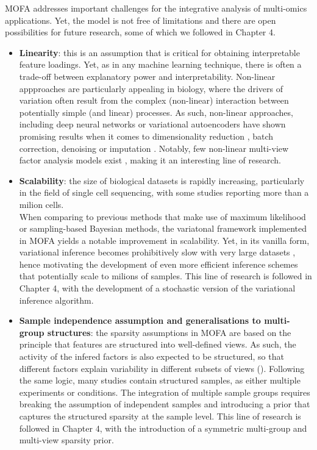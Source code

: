 MOFA addresses important challenges for the integrative analysis of multi-omics applications. Yet, the model is not free of limitations and there are open possibilities for future research, some of which we followed in Chapter 4.\\
\begin{itemize}

	\item \textbf{Linearity}: this is an assumption that is critical for obtaining interpretable feature loadings. Yet, as in any machine learning technique, there is often a trade-off between explanatory power and interpretability\cite{Kuhn}. Non-linear appproaches are particularly appealing in biology, where the drivers of variation often result from the complex (non-linear) interaction between potentially simple (and linear) processes. As such, non-linear approaches, including deep neural networks or variational autoencoders have shown promising results when it comes to dimensionality reduction \cite{Lin2017,Ding2018,Lopez2018}, batch correction\cite{Lopez2018}, denoising \cite{Eraslan2019} or imputation \cite{Lin2016}. Notably, few non-linear multi-view factor analysis models exist \cite{Damianou2016}, making it an interesting line of research.

	\item \textbf{Scalability}: the size of biological datasets is rapidly increasing, particularly in the field of single cell sequencing, with some studies reporting more than a milion cells\cite{Svensson2018,Cao2019}. \\
	When comparing to previous methods that make use of maximum likelihood or sampling-based Bayesian methods, the variatonal framework implemented in MOFA yields a notable improvement in scalability. Yet, in its vanilla form, variational inference becomes prohibitively slow with very large datasets \cite{Hoffman2013,Blei2016,Hoffman2014}, hence motivating the development of even more efficient inference schemes that potentially scale to milions of samples. This line of research is followed in Chapter 4, with the development of a stochastic version of the variational inference algorithm.

	\item \textbf{Sample independence assumption and generalisations to multi-group structures}: the sparsity assumptions in MOFA are based on the principle that features are structured into well-defined views. As such, the activity of the infered factors is also expected to be structured, so that different factors explain variability in different subsets of views (). Following the same logic, many studies contain structured samples, as either multiple experiments or conditions. The integration of multiple sample groups requires breaking the assumption of independent samples and introducing a prior that captures the structured sparsity at the sample level. This line of research is followed in Chapter 4, with the introduction of a symmetric multi-group and multi-view sparsity prior.


\end{itemize}
